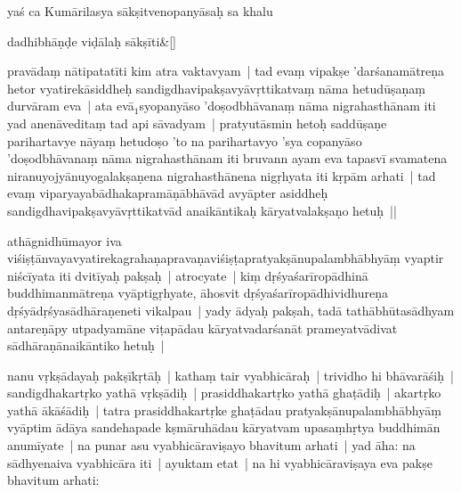 \documentclass[article,12pt,a4paper]{memoir}%
\newcommand{\gap}[1]{}
\newcounter{parCount}
\begin{document}
	  \pstart \leavevmode%
	\hphantom{.}\label{thakur75-43.20}yaś ca Kumārilasya sākṣitvenopanyāsaḥ sa khalu 
	    \pend%
	  
	    
	    \stanza[\smallbreak]
	  dadhibhāṇḍe viḍālaḥ sākṣīti\&[\smallbreak]
	  
	  
	  
	    \pstart  \leavevmode%
	    \hphantom{.}
	   pravādaṃ nātipatatīti kim atra vaktavyam | tad evaṃ vipakṣe 'darśanamātreṇa hetor vyatirekāsiddheḥ sandigdhavipakṣavyāvṛttikatvaṃ nāma hetudūṣaṇaṃ durvāram eva | ata evā{\tiny $_{1}$}syopanyāso 'doṣodbhāvanaṃ nāma nigrahasthānam iti yad anenāveditaṃ tad api sāvadyam | pratyutāsmin heto\gap{}ḥ saddūṣaṇe parihartavye nāyaṃ hetudoṣo 'to na parihartavyo 'sya copanyāso 'doṣodbhāvanaṃ nāma nigrahasthānam iti bruvann ayam eva tapasvī svamatena niranuyojyānuyogalakṣaṇena nigrahasthānena nigṛhyata iti kṛpām arhati | tad evaṃ viparyayabādhakapramāṇābhāvād avyāpter asiddheḥ sandigdhavipakṣavyāvṛttikatvād anaikāntikaḥ kāryatvalakṣaṇo hetuḥ ||
	{}
	\pend%
      
	  
	

	  \pstart \leavevmode%
	\label{thakur75-43.30}athāgnidhūmayor iva viśiṣṭānvayavyatirekagrahaṇapravaṇaviśiṣṭapratyakṣānupalambhābhyāṃ vyaptir niścīyata iti dvitīyaḥ pakṣaḥ | atrocyate | kiṃ dṛśyaśarīropādhinā buddhimanmātreṇa vyāptigṛhyate, āhosvit dṛśyaśarīropādhividhureṇa dṛśyādṛśyasādhāraṇeneti vikalpau | yady ādyaḥ pakṣah, tadā tathābhūtasādhyam antareṇāpy utpadyamāne viṭapādau kāryatvadarśanāt prameyatvādivat sādhāraṇānaikāntiko hetuḥ |
	{}
	\pend%
      

	  \pstart \leavevmode%
	\label{thakur75-44.2} nanu vṛkṣādayaḥ pakṣīkṛtāḥ | kathaṃ tair vyabhicāraḥ | trividho hi bhāvarāśiḥ | sandigdhakartṛko yathā vṛkṣādiḥ | prasiddhakartṛko yathā ghaṭādiḥ | akartṛko yathā ākāśādiḥ | tatra prasiddhakartṛke ghaṭādau pratyakṣānupalambhābhyāṃ vyāptim ādāya sandehapade kṣmāruhādau kāryatvam upasaṃhṛtya buddhimān anumīyate | na punar asu vyabhicāraviṣayo bhavitum arhati | \label{thakur75-44.8} yad āha: na sādhyenaiva vyabhicāra iti | ayuktam etat | na hi vyabhicāraviṣaya eva pakṣe bhavitum arhati:
	{}
	\pend%
      
\end{document}
